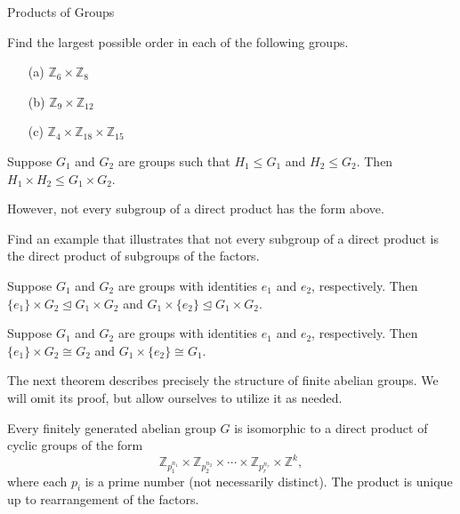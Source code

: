 \begin{section}{Products of Groups}
\begin{exercise}
Find the largest possible order in each of the following groups.
\begin{enumerate}
\item[(a)] $\mathbb{Z}_6\times \mathbb{Z}_8$
\item[(b)] $\mathbb{Z}_9\times \mathbb{Z}_{12}$
\item[(c)] $\mathbb{Z}_4\times \mathbb{Z}_{18}\times \mathbb{Z}_{15}$
\end{enumerate}
\end{exercise}

\begin{theorem}
Suppose $G_1$ and $G_2$ are groups such that $H_1\leq G_1$ and $H_2\leq G_2$.  Then $H_1\times H_2\leq G_1\times G_2$.
\end{theorem}

However, not every subgroup of a direct product has the form above. 

\begin{problem}
Find an example that illustrates that not every subgroup of a direct product is the direct product of subgroups of the factors.
\end{problem}

\begin{theorem}
Suppose $G_1$ and $G_2$ are groups with identities $e_1$ and $e_2$, respectively.  Then $\{e_1\}\times G_2\trianglelefteq G_1\times G_2$ and $G_1\times \{e_2\}\trianglelefteq G_1\times G_2$.
\end{theorem}

\begin{theorem}
Suppose $G_1$ and $G_2$ are groups with identities $e_1$ and $e_2$, respectively.  Then $\{e_1\}\times G_2\cong G_2$ and $G_1\times \{e_2\}\cong G_1$.
\end{theorem}

The next theorem describes precisely the structure of finite abelian groups.  We will omit its proof, but allow ourselves to utilize it as needed.

\begin{theorem}
Every finitely generated abelian group $G$ is isomorphic to a direct product of cyclic groups of the form
\[
\mathbb{Z}_{p_1^{n_1}}\times \mathbb{Z}_{p_2^{n_2}}\times \cdots \times \mathbb{Z}_{p_r^{n_r}}\times \mathbb{Z}^k,
\]
where each $p_i$ is a prime number (not necessarily distinct).  The product is unique up to rearrangement of the factors.
\end{theorem}


\end{section}
